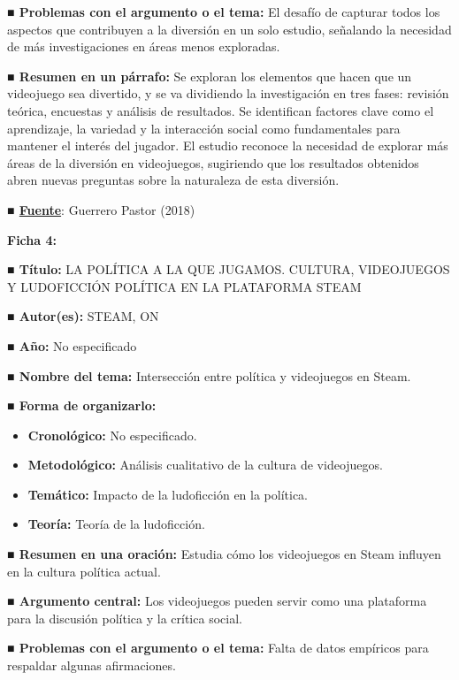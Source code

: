 \documentclass[
  letterpaper,
  DIV=11,
  numbers=noendperiod]{scrreprt}
\begin{document}
\textbf{■ Problemas con el argumento o el tema:} El desafío de capturar
todos los aspectos que contribuyen a la diversión en un solo estudio,
señalando la necesidad de más investigaciones en áreas menos exploradas.

\textbf{■ Resumen en un párrafo:} Se exploran los elementos que hacen
que un videojuego sea divertido, y se va dividiendo la investigación en
tres fases: revisión teórica, encuestas y análisis de resultados. Se
identifican factores clave como el aprendizaje, la variedad y la
interacción social como fundamentales para mantener el interés del
jugador. El estudio reconoce la necesidad de explorar más áreas de la
diversión en videojuegos, sugiriendo que los resultados obtenidos abren
nuevas preguntas sobre la naturaleza de esta diversión.

\textbf{■
\href{https://rua.ua.es/dspace/bitstream/10045/73641/1/Que_hace_divertido_un_videojuego_Acercamiento_al_conce_GUERRERO_PASTOR_MARTA.pdf}{Fuente}}:
Guerrero Pastor (2018)

\textbf{Ficha 4:}

\textbf{■ Título:} LA POLÍTICA A LA QUE JUGAMOS. CULTURA, VIDEOJUEGOS Y
LUDOFICCIÓN POLÍTICA EN LA PLATAFORMA STEAM

\textbf{■ Autor(es):} STEAM, ON

\textbf{■ Año:} No especificado

\textbf{■ Nombre del tema:} Intersección entre política y videojuegos en
Steam.

\textbf{■ Forma de organizarlo:}

\begin{itemize}
\item
  \textbf{Cronológico:} No especificado.
\item
  \textbf{Metodológico:} Análisis cualitativo de la cultura de
  videojuegos.
\item
  \textbf{Temático:} Impacto de la ludoficción en la política.
\item
  \textbf{Teoría:} Teoría de la ludoficción.
\end{itemize}

\textbf{■ Resumen en una oración:} Estudia cómo los videojuegos en Steam
influyen en la cultura política actual.

\textbf{■ Argumento central:} Los videojuegos pueden servir como una
plataforma para la discusión política y la crítica social.

\textbf{■ Problemas con el argumento o el tema:} Falta de datos
empíricos para respaldar algunas afirmaciones.
\end{document}
